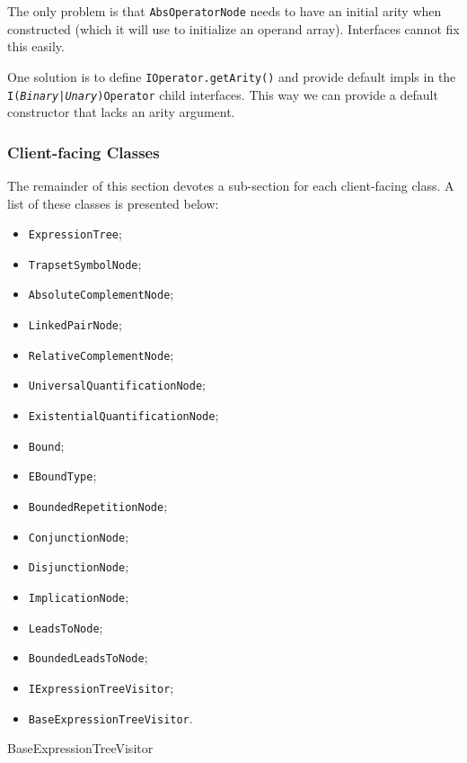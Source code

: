 \documentclass[12pt,oneside,a4paper,notitlepage]{report}
\begin{document}
	\bigskip

	\par The only problem is that \texttt{AbsOperatorNode} needs to have an initial arity when constructed (which it will use to initialize an operand array). Interfaces cannot fix this easily.

	\bigskip

	\par One solution is to define \texttt{IOperator.getArity()} and provide default impls in the \texttt{I(\textit{Binary|Unary})Operator} child interfaces. This way we can provide a default constructor that lacks an arity argument.

	\subsubsection*{Client-facing Classes}
	\par The remainder of this section devotes a sub-section for each client-facing class. A list of these classes is presented below:
	\begin{itemize}
		\item \texttt{ExpressionTree};
		\item \texttt{TrapsetSymbolNode};
		\item \texttt{AbsoluteComplementNode};
		\item \texttt{LinkedPairNode};
		\item \texttt{RelativeComplementNode};
		\item \texttt{UniversalQuantificationNode};
		\item \texttt{ExistentialQuantificationNode};
		\item \texttt{Bound};
		\item \texttt{EBoundType};
		\item \texttt{BoundedRepetitionNode};
		\item \texttt{ConjunctionNode};
		\item \texttt{DisjunctionNode};
		\item \texttt{ImplicationNode};
		\item \texttt{LeadsToNode};
		\item \texttt{BoundedLeadsToNode};
		\item \texttt{IExpressionTreeVisitor};
		\item \texttt{BaseExpressionTreeVisitor}.
	\end{itemize}
BaseExpressionTreeVisitor
	\subsubsection{\texttt{}}

	\printbibliography[
		title=Sources
	]
\end{document}
